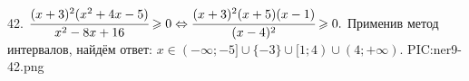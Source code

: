 42. $\cfrac{(x+3)^2(x^2+4x-5)}{x^2-8x+16}\geqslant0\Leftrightarrow\cfrac{(x+3)^2(x+5)(x-1)}{(x-4)^2}\geqslant0.$ Применив метод интервалов, найдём ответ: $x\in(-\infty;-5]\cup\{-3\}\cup[1;4)\cup(4;+\infty).$
{{PIC:ner9-42.png}}\\
